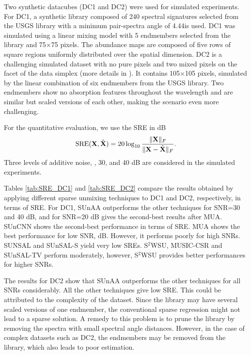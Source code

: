 Two synthetic datacubes (DC1 and DC2) were used for simulated experiments. For DC1, a synthetic library composed of 240 spectral signatures selected from the USGS library with a minimum pair-spectra angle of 4.44\textdegree is used. DC1 was simulated using a linear mixing model with 5 endmembers selected from the library and 75$\times$75 pixels. The abundance maps are composed of five rows of square regions uniformly distributed over the spatial dimension. DC2 is a challenging simulated dataset with no pure pixels and two mixed pixels on the facet of the data simplex (more details in \cite{rasti_misicnet_2022}). It contains  105$\times$105 pixels, simulated by the linear combination of six endmembers from the USGS library. Two endmembers show no absorption features throughout the wavelength and are similar but scaled versions of each other, making the scenario even more challenging.

For the quantitative evaluation, we use the SRE in dB %
\begin{equation}
    \text{SRE}(\mathbf X, \hat{\mathbf X})=20\log_{10}\frac{\|{\mathbf X}\|_F}{\|{\mathbf X}-\hat{\mathbf X}\|_F}.
\end{equation}
Three levels of additive noise, , 30, and 40 dB are considered in the simulated experiments.

Tables \ref{tab:SRE_DC1} and \ref{tab:SRE_DC2} compare the results obtained by applying different sparse unmixing techniques to DC1 and DC2, respectively, in terms of SRE. For DC1, SUnAA outperforms the other techniques for SNR=30 and 40 dB, and for SNR=20 dB gives the second-best results after MUA. SUnCNN shows the second-best performance in terms of SRE. MUA shows the best performance for low SNR,  dB. However, it performs poorly for high SNRs. SUNSAL and SUnSAL-S yield very low SREs. S$^2$WSU, MUSIC-CSR and SUnSAL-TV perform moderately, however, S$^2$WSU provides better performances for higher SNRs. 

The results for DC2 show that SUnAA outperforms the other techniques for all SNRs considerably. All the other techniques give low SRE. This could be attributed to the complexity of the dataset. Since the library may have several scaled versions of one endmember, the conventional sparse regression might not lead to a sparse solution. A remedy to this problem is to prune the library by removing the spectra with small spectral angle distances. However, in the case  of complex datasets such as DC2, the endmembers may be removed from the library, which also leads to poor estimation. 


